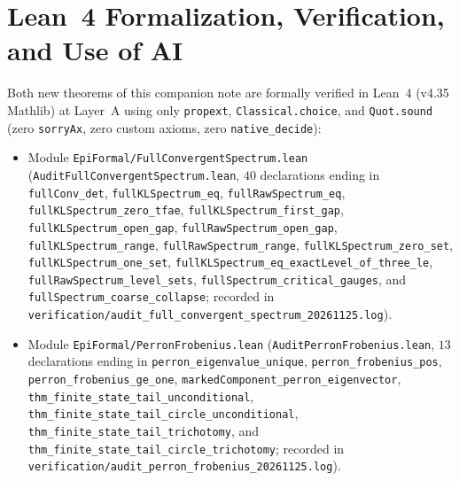 \documentclass[11pt]{article}
\theoremstyle{definition}
\theoremstyle{remark}
\begin{document}
\section{Lean~4 Formalization, Verification, and Use of AI}\label{sec:verification}

Both new theorems of this companion note are formally verified in Lean~4 (v4.35
Mathlib) at Layer~A using only \texttt{propext}, \texttt{Classical.choice}, and
\texttt{Quot.sound} (zero \texttt{sorryAx}, zero custom axioms, zero
\texttt{native\_decide}):
\begin{sloppypar}
\begin{itemize}[leftmargin=2em]
\item Module \texttt{EpiFormal/\allowbreak FullConvergentSpectrum.lean}
(\texttt{AuditFullConvergentSpectrum.lean}, $40$ declarations ending in
\texttt{fullConv\_\allowbreak det}, \texttt{fullKLSpectrum\_\allowbreak eq},
\texttt{fullRawSpectrum\_\allowbreak eq}, \texttt{fullKLSpectrum\_\allowbreak zero\_\allowbreak tfae},
\texttt{fullKLSpectrum\_\allowbreak first\_\allowbreak gap},
\texttt{fullKLSpectrum\_\allowbreak open\_\allowbreak gap},
\texttt{fullRawSpectrum\_\allowbreak open\_\allowbreak gap},
\texttt{fullKLSpectrum\_\allowbreak range}, \texttt{fullRawSpectrum\_\allowbreak range},
\texttt{fullKLSpectrum\_\allowbreak zero\_\allowbreak set},
\texttt{fullKLSpectrum\_\allowbreak one\_\allowbreak set},
\texttt{fullKLSpectrum\_\allowbreak eq\_\allowbreak exactLevel\_\allowbreak of\_\allowbreak three\_\allowbreak le},
\texttt{fullRawSpectrum\_\allowbreak level\_\allowbreak sets},
\texttt{fullSpectrum\_\allowbreak critical\_\allowbreak gauges}, and
\texttt{fullSpectrum\_\allowbreak coarse\_\allowbreak collapse}; recorded in
\texttt{verification/\allowbreak audit\_\allowbreak full\_\allowbreak convergent\_\allowbreak spectrum\_\allowbreak 20261125.log}).
\item Module \texttt{EpiFormal/\allowbreak PerronFrobenius.lean}
(\texttt{AuditPerronFrobenius.lean}, $13$ declarations ending in
\texttt{perron\_\allowbreak eigenvalue\_\allowbreak unique},
\texttt{perron\_\allowbreak frobenius\_\allowbreak pos},
\texttt{perron\_\allowbreak frobenius\_\allowbreak ge\_\allowbreak one},
\texttt{markedComponent\_\allowbreak perron\_\allowbreak eigenvector},
\texttt{thm\_\allowbreak finite\_\allowbreak state\_\allowbreak tail\_\allowbreak unconditional},
\texttt{thm\_\allowbreak finite\_\allowbreak state\_\allowbreak tail\_\allowbreak circle\_\allowbreak unconditional},
\texttt{thm\_\allowbreak finite\_\allowbreak state\_\allowbreak tail\_\allowbreak trichotomy}, and
\texttt{thm\_\allowbreak finite\_\allowbreak state\_\allowbreak tail\_\allowbreak circle\_\allowbreak trichotomy}; recorded in
\texttt{verification/\allowbreak audit\_\allowbreak perron\_\allowbreak frobenius\_\allowbreak 20261125.log}).
\end{itemize}
\end{sloppypar}
\end{document}
